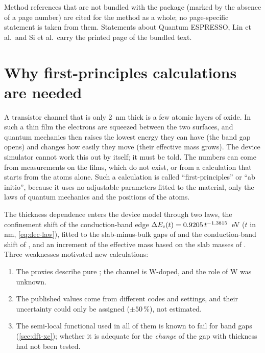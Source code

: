 Method references that are not bundled with the package (marked by the absence of a page number) are cited for the
method as a whole; no page-specific statement is taken from them. Statements about Quantum ESPRESSO, Lin et al.\ and
Si et al.\ carry the printed page of the bundled text.

\section{Why first-principles calculations are needed}
\label{sec:dft-motivation}

\begin{dftplain}
A transistor channel that is only 2~nm thick is a few atomic layers of oxide. In such a thin film the electrons are
squeezed between the two surfaces, and quantum mechanics then raises the lowest energy they can have (the band gap
opens) and changes how easily they move (their effective mass grows). The device simulator cannot work this out by
itself; it must be told. The numbers can come from measurements on the films, which do not exist, or from a
calculation that starts from the atoms alone. Such a calculation is called ``first-principles'' or ``ab initio'',
because it uses no adjustable parameters fitted to the material, only the laws of quantum mechanics and the positions
of the atoms.
\end{dftplain}

The thickness dependence enters the device model through two laws, the confinement shift of the conduction-band edge
$\Delta E_{\mathrm{c}}(t) = 0.9205\,t^{-1.3815}$~eV ($t$ in nm, \cref{eq:dec-law}), fitted to the slab-minus-bulk gaps of
\citet[p.~21542]{Lin2022} and the conduction-band shift of \citet[p.~504]{Si2021}, and an increment of the effective mass
based on the slab masses of \citet[p.~21540]{Lin2022}. Three weaknesses motivated new calculations:
\begin{enumerate}
\item The proxies describe pure \InO; the channel is W-doped, and the role of W was unknown.
\item The published values come from different codes and settings, and their uncertainty could only be assigned
($\pm50$\,\%), not estimated.
\item The semi-local functional used in all of them is known to fail for band gaps (\cref{sec:dft-xc}); whether it is
adequate for the \emph{change} of the gap with thickness had not been tested.
\end{enumerate}

